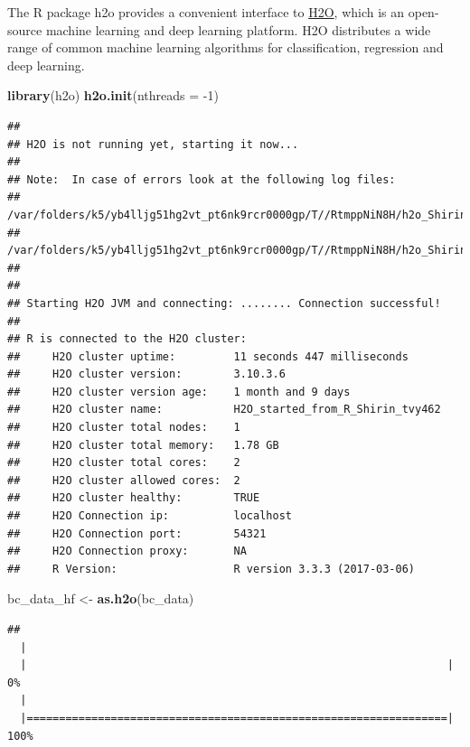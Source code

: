 \documentclass[]{article}
\newenvironment{Shaded}{\begin{snugshade}}{\end{snugshade}}
\newcommand{\KeywordTok}[1]{\textcolor[rgb]{0.13,0.29,0.53}{\textbf{{#1}}}}
\newcommand{\DataTypeTok}[1]{\textcolor[rgb]{0.13,0.29,0.53}{{#1}}}
\newcommand{\DecValTok}[1]{\textcolor[rgb]{0.00,0.00,0.81}{{#1}}}
\newcommand{\StringTok}[1]{\textcolor[rgb]{0.31,0.60,0.02}{{#1}}}
\newcommand{\NormalTok}[1]{{#1}}
\begin{document}
The R package h2o provides a convenient interface to
\href{http://www.h2o.ai/h2o/}{H2O}, which is an open-source machine
learning and deep learning platform. H2O distributes a wide range of
common machine learning algorithms for classification, regression and
deep learning.

\begin{Shaded}
\begin{Highlighting}[]
\KeywordTok{library}\NormalTok{(h2o)}
\KeywordTok{h2o.init}\NormalTok{(}\DataTypeTok{nthreads =} \NormalTok{-}\DecValTok{1}\NormalTok{)}
\end{Highlighting}
\end{Shaded}

\begin{verbatim}
## 
## H2O is not running yet, starting it now...
## 
## Note:  In case of errors look at the following log files:
##     /var/folders/k5/yb4lljg51hg2vt_pt6nk9rcr0000gp/T//RtmppNiN8H/h2o_Shirin_started_from_r.out
##     /var/folders/k5/yb4lljg51hg2vt_pt6nk9rcr0000gp/T//RtmppNiN8H/h2o_Shirin_started_from_r.err
## 
## 
## Starting H2O JVM and connecting: ........ Connection successful!
## 
## R is connected to the H2O cluster: 
##     H2O cluster uptime:         11 seconds 447 milliseconds 
##     H2O cluster version:        3.10.3.6 
##     H2O cluster version age:    1 month and 9 days  
##     H2O cluster name:           H2O_started_from_R_Shirin_tvy462 
##     H2O cluster total nodes:    1 
##     H2O cluster total memory:   1.78 GB 
##     H2O cluster total cores:    2 
##     H2O cluster allowed cores:  2 
##     H2O cluster healthy:        TRUE 
##     H2O Connection ip:          localhost 
##     H2O Connection port:        54321 
##     H2O Connection proxy:       NA 
##     R Version:                  R version 3.3.3 (2017-03-06)
\end{verbatim}

\begin{Shaded}
\begin{Highlighting}[]
\NormalTok{bc_data_hf <-}\StringTok{ }\KeywordTok{as.h2o}\NormalTok{(bc_data)}
\end{Highlighting}
\end{Shaded}

\begin{verbatim}
## 
  |                                                                       
  |                                                                 |   0%
  |                                                                       
  |=================================================================| 100%
\end{verbatim}
\end{document}
